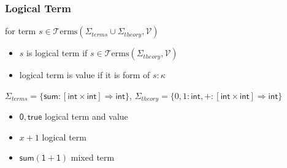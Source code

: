 \documentclass[12pt,aspectratio=169]{beamer}
\newcommand{\m}[1]{\mathsf{#1}}
\newcommand{\mi}[1]{\mathit{#1}}
\newcommand{\VV}{\mathcal{V}}
\newcommand{\TT}{\mathcal{T}}
\newcommand{\Terms}{\TT\mathrm{erms}}
\newcommand{\Stheory}{\Sigma_\mi{theory}}
\newcommand{\Sterms}{\Sigma_\mi{terms}}
\begin{document}
\begin{frame}
    \frametitle{Logical Term}

    \begin{definition}
        for term $s \in \Terms(\Sterms \cup \Stheory, \VV)$ \pause
        \begin{itemize}
            \item $s$ is \alert{logical term} if $s \in \Terms(\Stheory, \VV)$
            \pause
            \item logical term is \alert{value} if it is form of $s : \kappa$
        \end{itemize}
    \end{definition}
    \pause
    \begin{example}
        $\Sterms = \{\m{sum}: [\m{int} \times \m{int}] \Rightarrow \m{int}\}$,
        $\Stheory=\{0,1 : \m{int}, +:[\m{int} \times \m{int}] \Rightarrow \m{int}\}$
        \pause
        \begin{itemize}
            \item $\m{0},\m{true}$ \quad \pause logical term and value
                \pause
            \item $x + 1$ \quad  \pause logical term
            \pause 
            \item $\m{sum}{(\m{1} + \m{1})}$ \quad \pause mixed term
        \end{itemize}
    \end{example}
\end{frame}
\end{document}
